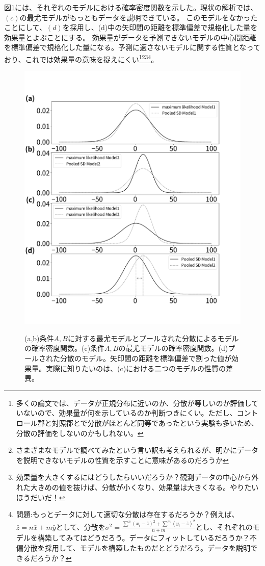 図\ref{fig:cohen_d_pooled_std_model}には、それぞれのモデルにおける確率密度関数を示した。現状の解析では、$(c)$の最尤モデルがもっともデータを説明できている。
このモデルをなかったことにして、$(d)$を採用し、(d)中の矢印間の距離を標準偏差で規格化した量を効果量とよぶことにする。
効果量がデータを予測できないモデルの中心間距離を標準偏差で規格化した量になる。予測に適さないモデルに関する性質となっており、これでは効果量の意味を捉えにくい\footnote{多くの論文では、データが正規分布に近いのか、分散が等しいのか評価していないので、効果量が何を示しているのか判断つきにくい。ただし、コントロール郡と対照郡とで分散がほとんど同等であったという実験も多いため、分散の評価をしないのかもしれない。}\footnote{さまざまなモデルで調べてみたという言い訳も考えられるが、明かにデータを説明できないモデルの性質を示すことに意味があるのだろうか}\footnote{効果量を大きくするにはどうしたらいいだろうか？観測データの中心から外れた大きめの値を抜けば、分散が小くなり、効果量は大きくなる。やりたいほうだいだ！}\footnote{問題:もっとデータに対して適切な分散は存在するだろうか？例えば、$\bar{z}=n\bar{x}+m\bar{y}$として、分散を$\sigma^2 = \frac{\sum^n(x_i-\bar{z})^2 + \sum^m (y_i-\bar{z})^2}{n+m}$とし、それぞれのモデルを構築してみてはどうだろう。データにフィットしているだろうか？不偏分散を採用して、モデルを構築したものだとどうだろう。データを説明できるだろうか？}。

\begin{figure}
 \begin{center}
  \includegraphics[width=12cm]{./image/12_/cohen_d_pooled_std_model.pdf}
  \label{fig:cohen_d_pooled_std_model}
  \caption{(a,b)条件$A,B$に対する最尤モデルとプールされた分散によるモデルの確率密度関数。(c)条件$A,B$の最尤モデルの確率密度関数。(d)プールされた分散のモデル。矢印間の距離を標準偏差で割った値が効果量。実際に知りたいのは、(c)における二つのモデルの性質の差異。}
 \end{center}
\end{figure}

